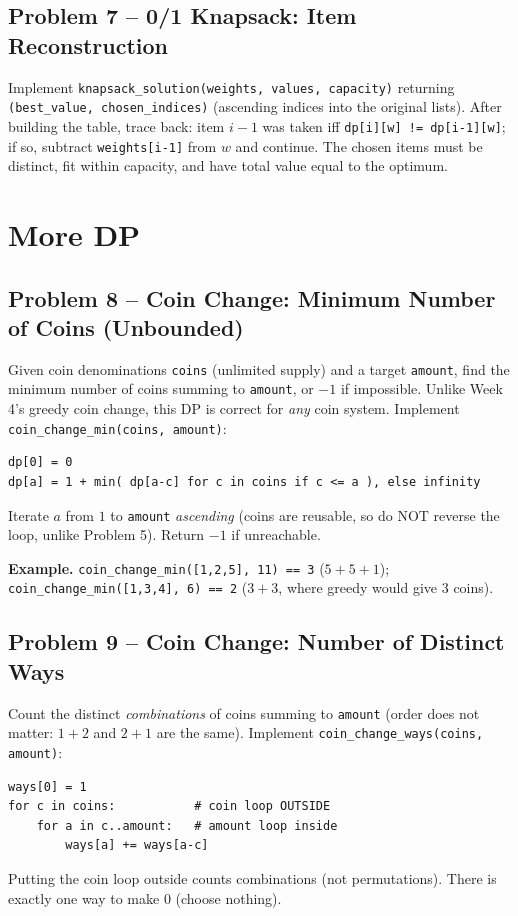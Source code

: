 \documentclass[11pt]{article}
\begin{document}
\subsection*{Problem 7 -- 0/1 Knapsack: Item Reconstruction}

Implement \texttt{knapsack\_solution(weights, values, capacity)} returning
\texttt{(best\_value, chosen\_indices)} (ascending indices into the original lists). After
building the table, trace back: item $i-1$ was taken iff
\texttt{dp[i][w] != dp[i-1][w]}; if so, subtract \texttt{weights[i-1]} from $w$ and
continue. The chosen items must be distinct, fit within capacity, and have total value
equal to the optimum.

\newpage
\section{More DP}

\subsection*{Problem 8 -- Coin Change: Minimum Number of Coins (Unbounded)}

Given coin denominations \texttt{coins} (unlimited supply) and a target \texttt{amount},
find the minimum number of coins summing to \texttt{amount}, or $-1$ if impossible. Unlike
Week 4's greedy coin change, this DP is correct for \emph{any} coin system. Implement
\texttt{coin\_change\_min(coins, amount)}:
\begin{verbatim}
dp[0] = 0
dp[a] = 1 + min( dp[a-c] for c in coins if c <= a ), else infinity
\end{verbatim}
Iterate $a$ from $1$ to \texttt{amount} \emph{ascending} (coins are reusable, so do NOT
reverse the loop, unlike Problem 5). Return $-1$ if unreachable.

\textbf{Example.} \texttt{coin\_change\_min([1,2,5], 11) == 3} ($5{+}5{+}1$);
\texttt{coin\_change\_min([1,3,4], 6) == 2} ($3{+}3$, where greedy would give 3 coins).

\subsection*{Problem 9 -- Coin Change: Number of Distinct Ways}

Count the distinct \emph{combinations} of coins summing to \texttt{amount} (order does not
matter: $1{+}2$ and $2{+}1$ are the same). Implement \texttt{coin\_change\_ways(coins,
amount)}:
\begin{verbatim}
ways[0] = 1
for c in coins:           # coin loop OUTSIDE
    for a in c..amount:   # amount loop inside
        ways[a] += ways[a-c]
\end{verbatim}
Putting the coin loop outside counts combinations (not permutations). There is exactly one
way to make $0$ (choose nothing).
\end{document}
